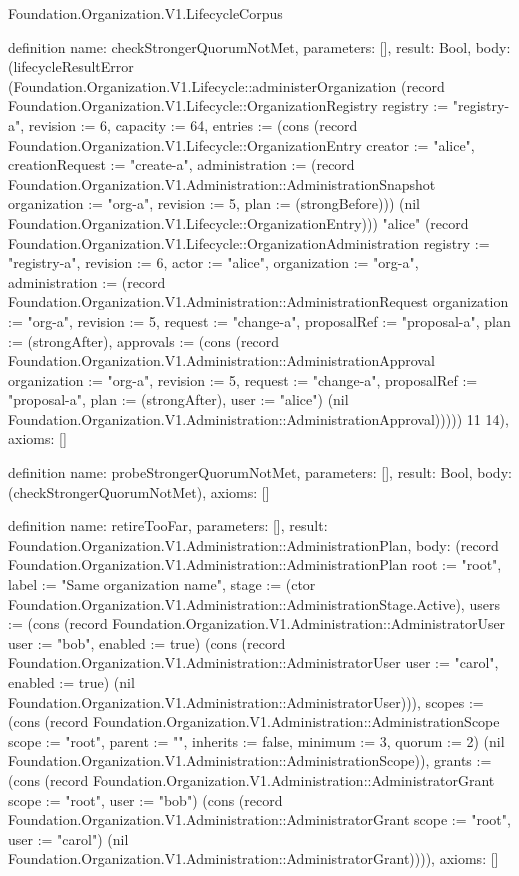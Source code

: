 \begin{lexlean}{Foundation.Organization.V1.LifecycleCorpus}
\begin{semanticmodule}
definition{
  name: checkStrongerQuorumNotMet,
  parameters: [],
  result: Bool,
  body: (lifecycleResultError (Foundation.Organization.V1.Lifecycle::administerOrganization (record Foundation.Organization.V1.Lifecycle::OrganizationRegistry {registry := "registry-a", revision := 6, capacity := 64, entries := (cons (record Foundation.Organization.V1.Lifecycle::OrganizationEntry {creator := "alice", creationRequest := "create-a", administration := (record Foundation.Organization.V1.Administration::AdministrationSnapshot {organization := "org-a", revision := 5, plan := (strongBefore)})}) (nil Foundation.Organization.V1.Lifecycle::OrganizationEntry))}) "alice" (record Foundation.Organization.V1.Lifecycle::OrganizationAdministration {registry := "registry-a", revision := 6, actor := "alice", organization := "org-a", administration := (record Foundation.Organization.V1.Administration::AdministrationRequest {organization := "org-a", revision := 5, request := "change-a", proposalRef := "proposal-a", plan := (strongAfter), approvals := (cons (record Foundation.Organization.V1.Administration::AdministrationApproval {organization := "org-a", revision := 5, request := "change-a", proposalRef := "proposal-a", plan := (strongAfter), user := "alice"}) (nil Foundation.Organization.V1.Administration::AdministrationApproval))})})) 11 14),
  axioms: []
}

definition{
  name: probeStrongerQuorumNotMet,
  parameters: [],
  result: Bool,
  body: (checkStrongerQuorumNotMet),
  axioms: []
}

definition{
  name: retireTooFar,
  parameters: [],
  result: Foundation.Organization.V1.Administration::AdministrationPlan,
  body: (record Foundation.Organization.V1.Administration::AdministrationPlan {root := "root", label := "Same organization name", stage := (ctor Foundation.Organization.V1.Administration::AdministrationStage.Active), users := (cons (record Foundation.Organization.V1.Administration::AdministratorUser {user := "bob", enabled := true}) (cons (record Foundation.Organization.V1.Administration::AdministratorUser {user := "carol", enabled := true}) (nil Foundation.Organization.V1.Administration::AdministratorUser))), scopes := (cons (record Foundation.Organization.V1.Administration::AdministrationScope {scope := "root", parent := "", inherits := false, minimum := 3, quorum := 2}) (nil Foundation.Organization.V1.Administration::AdministrationScope)), grants := (cons (record Foundation.Organization.V1.Administration::AdministratorGrant {scope := "root", user := "bob"}) (cons (record Foundation.Organization.V1.Administration::AdministratorGrant {scope := "root", user := "carol"}) (nil Foundation.Organization.V1.Administration::AdministratorGrant)))}),
  axioms: []
}


\end{semanticmodule}
\end{lexlean}
